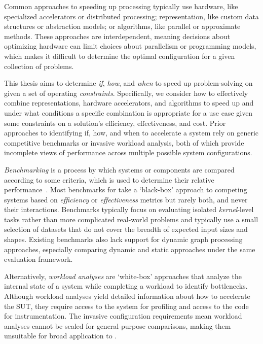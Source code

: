 Common approaches to speeding up \gai processing typically use hardware, like specialized accelerators or distributed processing; representation, like custom data structures or abstraction models; or algorithms, like parallel or approximate methods.
These approaches are interdependent, meaning decisions about optimizing hardware can limit choices about parallelism or programming models, which makes it difficult to determine the optimal configuration for a given collection of problems. 

This thesis aims to determine \textit{if}, \textit{how}, and \textit{when} to speed up problem-solving on \gai given a set of operating \textit{constraints}.
Specifically, we consider how to effectively combine representations, hardware accelerators, and algorithms to speed up \gai and under what conditions a specific combination is appropriate for a use case given some constraints on a solution's efficiency, effectiveness, and cost.
Prior approaches to identifying if, how, and when to accelerate a \gai system rely on generic competitive benchmarks or invasive workload analysis, both of which provide incomplete views of \gai performance across multiple possible system configurations. 

\textit{Benchmarking} is a process by which systems or components are compared according to some criteria, which is used to determine their relative performance~\cite{Kistowski2015}.
Most benchmarks for \gai take a `black-box' approach to competing systems based on \textit{efficiency} or \textit{effectiveness} metrics but rarely both, and never their interactions.
Benchmarks typically focus on evaluating isolated \textit{kernel}-level tasks rather than more complicated real-world problems and typically use a small selection of datasets that do not cover the breadth of expected input sizes and shapes.
Existing benchmarks also lack support for dynamic graph processing approaches, especially comparing dynamic and static approaches under the same evaluation framework.

Alternatively, \textit{workload analyses} are `white-box' approaches that analyze the internal state of a system while completing a workload to identify bottlenecks. 
Although workload analyses yield detailed information about how to accelerate the \ac{SUT}, they require access to the system for profiling and access to the code for instrumentation. 
The invasive configuration requirements mean workload analyses cannot be scaled for general-purpose comparisons, making them unsuitable for broad application to \gai.

